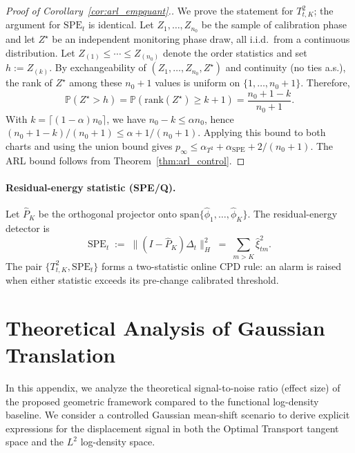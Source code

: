 \documentclass{article}
\theoremstyle{plain}
\theoremstyle{definition}
\theoremstyle{remark}
\begin{document}
\begin{proof}[Proof of Corollary~\ref{cor:arl_empquant}.]
We prove the statement for $T_{t,K}^2$; the argument for $\mathrm{SPE}_t$ is identical.
Let $Z_1,\dots,Z_{n_0}$ be the sample of calibration phase and let $Z^\star$ be an independent monitoring phase draw, all i.i.d.\ from a continuous distribution.
Let $Z_{(1)}\le\cdots\le Z_{(n_0)}$ denote the order statistics and set $h:=Z_{(k)}$.
By exchangeability of $(Z_1,\dots,Z_{n_0},Z^\star)$ and continuity (no ties a.s.), the rank of $Z^\star$ among these $n_0+1$ values is uniform on $\{1,\dots,n_0+1\}$.
Therefore,
\[
\mathbb P(Z^\star>h)=\mathbb P(\mathrm{rank}(Z^\star)\ge k+1)=\frac{n_0+1-k}{n_0+1}.
\]
With $k=\lceil (1-\alpha)n_0\rceil$, we have $n_0-k\le \alpha n_0$, hence $(n_0+1-k)/(n_0+1)\le \alpha + 1/(n_0+1)$.
Applying this bound to both charts and using the union bound gives $p_\infty\le \alpha_{T^2}+\alpha_{\mathrm{SPE}}+2/(n_0+1)$.
The ARL bound follows from Theorem~\ref{thm:arl_control}.
\end{proof}

\paragraph{Residual-energy statistic (SPE/Q).}
Let $\widehat P_K$ be the orthogonal projector onto
$\mathrm{span}\{\widehat\phi_1,\dots,\widehat\phi_K\}$.
The residual-energy detector is
\begin{equation}
\label{eq:SPE-app}
\mathrm{SPE}_t
\;:=\;
\big\|(I-\widehat P_K)\Delta_t\big\|_H^2
\;=\;
\sum_{m>K}\widehat\xi_{tm}^2.
\end{equation}
The pair $\{T_{t,K}^2,\mathrm{SPE}_t\}$ forms a two-statistic online CPD rule: an alarm is raised when either
statistic exceeds its pre-change calibrated threshold.


\section{Theoretical Analysis of Gaussian Translation}
\label{app:proof_gaussian}

In this appendix, we analyze the theoretical signal-to-noise ratio (effect size) of the proposed geometric framework compared to the functional log-density baseline. We consider a controlled Gaussian mean-shift scenario to derive explicit expressions for the displacement signal in both the Optimal Transport tangent space and the $L^2$ log-density space.
\end{document}

